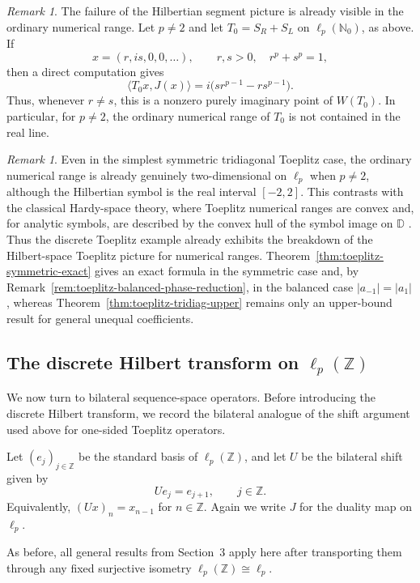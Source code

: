 \documentclass[11pt]{amsart}
\numberwithin{equation}{section}
\theoremstyle{definition}
\theoremstyle{remark}
\newtheorem{remark}[theorem]{Remark}
\begin{document}
\begin{remark} The failure of the Hilbertian segment picture is already visible
in the ordinary numerical range. Let \(p\ne2\) and let
\(T_0=S_R+S_L\) on \(\ell_p(\mathbb N_0)\), as above. If
\[
        x=(r,is,0,0,\ldots),\qquad r,s>0,\quad r^p+s^p=1,
\]
then a direct computation gives
\[
        \langle T_0x,J(x)\rangle
        =
        i\bigl(sr^{p-1}-rs^{p-1}\bigr).
\]
Thus, whenever \(r\ne s\), this is a nonzero purely imaginary point of
\(W(T_0)\). In particular, for \(p\ne2\), the ordinary numerical range of
\(T_0\) is not contained in the real line.
\end{remark}


\begin{remark}
Even in the simplest symmetric tridiagonal Toeplitz case, the ordinary numerical range is already genuinely two-dimensional on $\ell_p$ when $p\neq2$, although the Hilbertian symbol is the real interval $[-2,2]$. This contrasts with the classical Hardy-space theory, where Toeplitz numerical ranges are convex and, for analytic symbols, are described by the convex hull of the symbol image on $\mathbb D$ \cite{KleinToeplitz}. Thus the discrete Toeplitz example already exhibits the breakdown of the Hilbert-space Toeplitz picture for numerical ranges. Theorem~\ref{thm:toeplitz-symmetric-exact} gives an exact formula in the symmetric case and, by Remark~\ref{rem:toeplitz-balanced-phase-reduction}, in the balanced case $|a_{-1}|=|a_1|$, whereas Theorem~\ref{thm:toeplitz-tridiag-upper} remains only an upper-bound result for general unequal coefficients.
\end{remark}



\subsection{The discrete Hilbert transform on $\ell_p(\mathbb Z)$}

We now turn to bilateral sequence-space operators. Before introducing the
discrete Hilbert transform, we record the bilateral analogue of the shift
argument used above for one-sided Toeplitz operators.

Let $(e_j)_{j\in\mathbb Z}$ be the standard basis of $\ell_p(\mathbb Z)$, and let
$U$ be the bilateral shift given by
\[
        Ue_j=e_{j+1},\qquad j\in\mathbb Z.
\]
Equivalently, $(Ux)_n=x_{n-1}$ for $n\in\mathbb Z$. Again we write $J$ for the duality map on $\ell_p$.

As before, all general results from Section~3 apply here after transporting them through any fixed surjective isometry $\ell_p(\mathbb Z)\cong\ell_p$.
\end{document}
